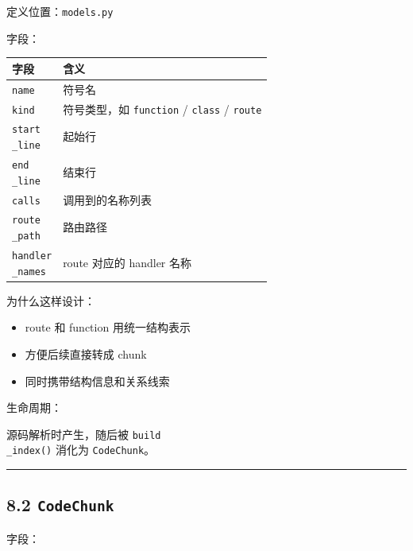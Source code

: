 \documentclass[UTF8,12pt,openany]{ctexbook}
\begin{document}
定义位置：\texttt{models.py}\par

字段：\par

\begin{center}
\small
\begin{longtable}{|p{}|p{}|}
\toprule
字段 & 含义 \\
\midrule
\texttt{name} & 符号名 \\
\texttt{kind} & 符号类型，如 \texttt{function} / \texttt{class} / \texttt{route} \\
\texttt{start\\_line} & 起始行 \\
\texttt{end\\_line} & 结束行 \\
\texttt{calls} & 调用到的名称列表 \\
\texttt{route\\_path} & 路由路径 \\
\texttt{handler\\_names} & route 对应的 handler 名称 \\
\bottomrule
\end{longtable}
\end{center}

为什么这样设计：\par

\begin{itemize}
\item route 和 function 用统一结构表示
\item 方便后续直接转成 chunk
\item 同时携带结构信息和关系线索
\end{itemize}

生命周期：\par

源码解析时产生，随后被 \texttt{build\\_index()} 消化为 \texttt{CodeChunk}。\par

\hrule

\subsection{8.2 \texttt{CodeChunk}}

字段：\par
\end{document}
